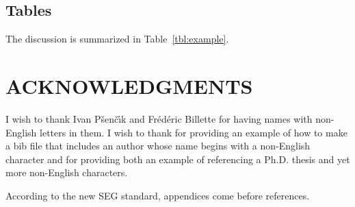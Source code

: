 \documentclass{georeport}
\begin{document}
\subsection{Tables}

The discussion is summarized in Table~\ref{tbl:example}.


\section{ACKNOWLEDGMENTS}

I wish to thank Ivan P\v{s}en\v{c}\'{\i}k and Fr\'ed\'eric Billette
for having names with non-English letters in them.  I wish to thank
\cite{Cerveny} for providing an example of how to make a bib file that
includes an author whose name begins with a non-English character and
\cite{forgues96} for providing both an example of referencing a Ph.D.
thesis and yet more non-English characters.

\label{example}

According to the new SEG standard, appendices come before references.
\end{document}

